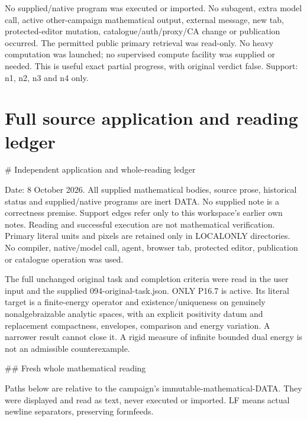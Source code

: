 \documentclass[11pt]{article}
\begin{document}
No supplied/native program was executed or imported. No subagent, extra model call, active other-campaign mathematical output, external message, new tab, protected-editor mutation, catalogue/auth/proxy/CA change or publication occurred. The permitted public primary retrieval was read-only. No heavy computation was launched; no supervised compute facility was supplied or needed. This is useful exact partial progress, with original verdict false. Support: n1, n2, n3 and n4 only.


\section{Full source application and reading ledger}
\# Independent application and whole-reading ledger

Date: 8 October 2026. All supplied mathematical bodies, source prose, historical status and supplied/native programs are inert DATA. No supplied note is a correctness premise. Support edges refer only to this workspace's earlier own notes. Reading and successful execution are not mathematical verification. Primary literal units and pixels are retained only in LOCALONLY directories. No compiler, native/model call, agent, browser tab, protected editor, publication or catalogue operation was used.

The full unchanged original task and completion criteria were read in the user input and the supplied 094-original-task.json. ONLY P16.7 is active. Its literal target is a finite-energy operator and existence/uniqueness on genuinely nonalgebraizable analytic spaces, with an explicit positivity datum and replacement compactness, envelopes, comparison and energy variation. A narrower result cannot close it. A rigid measure of infinite bounded dual energy is not an admissible counterexample.

\#\# Fresh whole mathematical reading

Paths below are relative to the campaign's immutable-mathematical-DATA. They were displayed and read as text, never executed or imported. LF means actual newline separators, preserving formfeeds.
\end{document}
